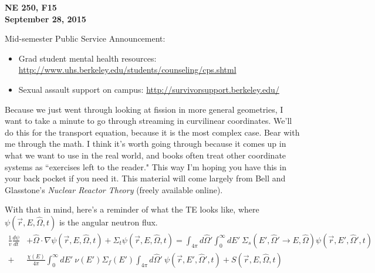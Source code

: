 \documentclass[12pt]{article}
\newcommand{\vOmega}{\ensuremath{\hat{\Omega}}}
\begin{document}
\begin{center}
{\bf NE 250, F15\\
September 28, 2015 
}
\end{center}

Mid-semester Public Service Announcement: 
\begin{itemize}
\item Grad student mental health resources: \url{http://www.uhs.berkeley.edu/students/counseling/cps.shtml}
\item Sexual assault support on campus: \url{http://survivorsupport.berkeley.edu/}
\end{itemize}


Because we just went through looking at fission in more general geometries, I want to take a minute to go through streaming in curvilinear coordinates. We'll do this for the transport equation, because it is the most complex case. Bear with  me through the math. I think it's worth going through because it comes up in what we want to use in the real world, and books often treat other coordinate systems as ``exercises left to the reader." This way I'm hoping you have this in your back pocket if you need it. This material will come largely from Bell and Glasstone's \textit{Nuclear Reactor Theory} (freely available online). 

With that in mind, here's a reminder of what the TE looks like, where $\psi(\vec{r}, E, \vOmega, t)$ is the angular neutron flux. 
%
\begin{align*}
\frac{1}{v} \frac{d \psi}{dt} &+ \vOmega \cdot \nabla \psi(\vec{r}, E, \vOmega, t) + \Sigma_t \psi(\vec{r}, E, \vOmega, t) = \int_{4 \pi} d\vOmega' \int_0^{\infty} dE' \: \Sigma_s(E', \vOmega' \rightarrow E, \vOmega) \psi(\vec{r}, E', \vOmega', t)\\
 +& \frac{\chi(E)}{4 \pi}\int_0^{\infty} dE' \: \nu(E') \Sigma_f(E') \int_{4 \pi} d\vOmega' \:\psi(\vec{r}, E', \vOmega', t) + S(\vec{r}, E, \vOmega, t)
\end{align*}
\end{document}
